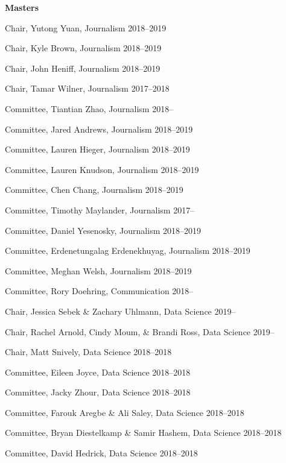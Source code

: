   \textbf{Masters}
    \begin{innerlist}
      \item Chair, Yutong Yuan, Journalism                                      \hfill 2018--2019
      \item Chair, Kyle Brown, Journalism                                       \hfill 2018--2019
      \item Chair, John Heniff, Journalism                                      \hfill 2018--2019
      \item Chair, Tamar Wilner, Journalism                                     \hfill 2017--2018
      \item Committee, Tiantian Zhao, Journalism                                \hfill 2018--\*
      \item Committee, Jared Andrews, Journalism                                \hfill 2018--2019
      \item Committee, Lauren Hieger, Journalism                                \hfill 2018--2019
      \item Committee, Lauren Knudson, Journalism                               \hfill 2018--2019
      \item Committee, Chen Chang, Journalism                                   \hfill 2018--2019
      \item Committee, Timothy Maylander, Journalism                            \hfill 2017--\*
      \item Committee, Daniel Yesenosky, Journalism                             \hfill 2018--2019
      \item Committee, Erdenetungalag Erdenekhuyag, Journalism                  \hfill 2018--2019
      \item Committee, Meghan Welsh, Journalism                                 \hfill 2018--2019
      \item Committee, Rory Doehring, Communication                             \hfill 2018--\*

      \item Chair, Jessica Sebek \& Zachary Uhlmann, Data Science               \hfill 2019--\*
      \item Chair, Rachel Arnold, Cindy Moum, \& Brandi Ross, Data Science      \hfill 2019--\*
      \item Chair, Matt Snively, Data Science                                   \hfill 2018--2018
      \item Committee, Eileen Joyce, Data Science                               \hfill 2018--2018
      \item Committee, Jacky Zhour, Data Science                                \hfill 2018--2018
      \item Committee, Farouk Aregbe \& Ali Saley, Data Science                 \hfill 2018--2018
      \item Committee, Bryan Diestelkamp \& Samir Hashem, Data Science          \hfill 2018--2018
      \item Committee, David Hedrick, Data Science                              \hfill 2018--2018
    \end{innerlist}\vspace{-.1in}
